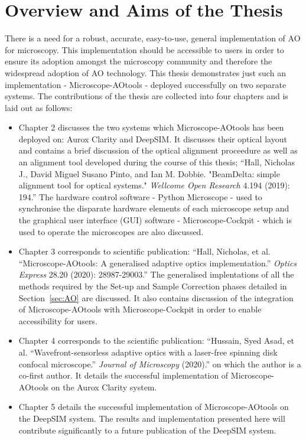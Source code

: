 \section{Overview and Aims of the Thesis}
\label{sec:overview}

There is a need for a robust, accurate, easy-to-use, general implementation 
of AO for microscopy\cite{ji2017adaptive,rodriguez2018adaptive}.
This implementation should be accessible to users in order to ensure its
adoption amongst the microscopy community and therefore the widespread 
adoption of AO technology. This thesis demonstrates just such an 
implementation - Microscope-AOtools - deployed successfully on two separate 
systems. The contributions of the thesis are collected into four chapters 
and is laid out as follows:

\begin{itemize}
	\item Chapter 2 discusses the two systems which Microscope-AOtools has
	been deployed on: Aurox Clarity and DeepSIM. It discusses their optical 
	layout and contains a brief discussion of the optical alignment 
	proceedure as well as an alignment tool developed during the course of 
	this thesis; ``Hall, Nicholas J., David Miguel Susano Pinto, and Ian M. 
	Dobbie. "BeamDelta: simple alignment tool for optical systems." 
	\textit{Wellcome Open Research} 4.194 (2019): 194.''\cite{dobbie2019beamdelta} 
	The hardware control software - Python Microscope - used to synchronise 
	the disparate hardware elements of each microscope setup and the 
	graphical user interface (GUI) software - Microscope-Cockpit - which 
	is used to operate the microscopes are also discussed.
	\item Chapter 3 corresponds to scientific publication: ``Hall, Nicholas, 
	et al. ``Microscope-AOtools: A generalised adaptive optics 
	implementation.''
	\textit{Optics Express} 28.20 (2020): 28987-29003.''\cite{hall2020microscope}
	The generalised implentations of all the methods required by the Set-up and 
	Sample Correction phases detailed in Section~\ref{sec:AO} are discussed.
	It also contains discussion of the integration of Microscope-AOtools with
	Microscope-Cockpit in order to enable accessibility for users.
	\item Chapter 4 corresponds to the scientific publication: ``Hussain, 
	Syed Asad, et al. ``Wavefront-sensorless adaptive optics with a 
	laser-free spinning disk confocal microscope.'' \textit{Journal of 
	Microscopy} (2020).'' 
	on which the author is a co-first author\cite{hussain2020wavefront}. It details the successful 
	implementation of Microscope-AOtools on the Aurox Clarity system.
	\item Chapter 5 details the successful implementation of Microscope-AOtools 
	on the DeepSIM system. The results and implementation presented here will
	contribute significantly to a future publication of the DeepSIM system.
\end{itemize}

